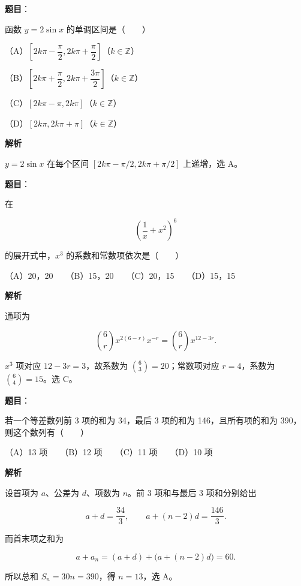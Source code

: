 \begin{answer}

\textbf{题目}：

函数 $y=2\sin x$ 的单调区间是\mbox{（　　）}

（A）$\left[2k\pi-\dfrac\pi2,2k\pi+\dfrac\pi2\right]$（$k\in\mathbb Z$）

（B）$\left[2k\pi+\dfrac\pi2,2k\pi+\dfrac{3\pi}2\right]$（$k\in\mathbb Z$）

（C）$[2k\pi-\pi,2k\pi]$（$k\in\mathbb Z$）

（D）$[2k\pi,2k\pi+\pi]$（$k\in\mathbb Z$）

\textbf{解析}

$y=2\sin x$ 在每个区间 $\left[2k\pi-\pi/2,2k\pi+\pi/2\right]$ 上递增，选 A。


\end{answer}
\begin{answer}

\textbf{题目}：

在

\nopagebreak[4]
\[
\left(\frac1x+x^2\right)^6
\]

的展开式中，$x^3$ 的系数和常数项依次是\mbox{（　　）}

（A）20，20　　（B）15，20　　（C）20，15　　（D）15，15

\textbf{解析}

通项为

\nopagebreak[4]
\[
\binom6r x^{2(6-r)}x^{-r}=\binom6r x^{12-3r}.
\]

$x^3$ 项对应 $12-3r=3$，故系数为 $\binom63=20$；常数项对应 $r=4$，系数为 $\binom64=15$。选 C。


\end{answer}
\begin{answer}

\textbf{题目}：

若一个等差数列前 3 项的和为 34，最后 3 项的和为 146，且所有项的和为 390，则这个数列有\mbox{（　　）}

（A）13 项　　（B）12 项　　（C）11 项　　（D）10 项

\textbf{解析}

设首项为 $a$、公差为 $d$、项数为 $n$。前 3 项和与最后 3 项和分别给出

\nopagebreak[4]
\[
a+d=\frac{34}{3},\qquad a+(n-2)d=\frac{146}{3}.
\]

而首末项之和为

\nopagebreak[4]
\[
a+a_n=(a+d)+\bigl(a+(n-2)d\bigr)=60.
\]

所以总和 $S_n=30n=390$，得 $n=13$，选 A。


\end{answer}

